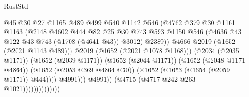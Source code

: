 \begin{lexlean}{RustStd}
\begin{coremodule}
{\begin{coremodule}
{{{{{{{{{{{                                              @45
                                              @30
                                              @27
                                              @1165
                                              @489
                                              @499
                                              @540
                                              @1142
                                              @546
                                              (@4762
                                                @379
                                                @30
                                                @1161
                                                @1163
                                                (@2148
                                                  @4602
                                                  @444
                                                  @82
                                                  @25
                                                  @30
                                                  @743
                                                  @593
                                                  @1150
                                                  @546
                                                  (@4636
                                                    @43
                                                    @122
                                                    @43
                                                    @743
                                                    (@1708 (@4641 @43))
                                                    @3012)
                                                  @2389))
                                              @4666
                                              @2019
                                              (@1652 (@2021 @1143 @489)))
                                            @2019
                                            (@1652 (@2021 @1078 @1168)))
                                          (@2034 (@2035 @1171))
                                          (@1652 (@2039 @1171))
                                          (@1652 (@2044 @1171))
                                          (@1652 (@2048 @1171 @4864))
                                          (@1652 (@2053 @369 @4864 @30))
                                          (@1652 (@1653 (@1654 (@2059 @1171)) @444))))
                                      @4991)))
                                @4991))
                            (@4715 (@4717 @242 @263 @1021))))))))))))))
}}}}}}}}}}}
\end{coremodule}}
\end{coremodule}
\end{lexlean}
